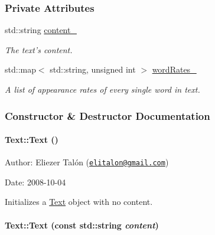\subsubsection*{Private Attributes}
\begin{CompactItemize}
\item 
\hypertarget{class_text_8c5acddb86730d41099c87da7e386f6c}{
std::string \hyperlink{class_text_8c5acddb86730d41099c87da7e386f6c}{content\_\-}}
\label{class_text_8c5acddb86730d41099c87da7e386f6c}

\begin{CompactList}\small\item\em The text's content. \item\end{CompactList}\item 
\hypertarget{class_text_5f7e6b9d9ba0dbd7c1b4070ab42f1de1}{
std::map$<$ std::string, unsigned int $>$ \hyperlink{class_text_5f7e6b9d9ba0dbd7c1b4070ab42f1de1}{wordRates\_\-}}
\label{class_text_5f7e6b9d9ba0dbd7c1b4070ab42f1de1}

\begin{CompactList}\small\item\em A list of appearance rates of every single word in text. \item\end{CompactList}\end{CompactItemize}


\subsubsection{Constructor \& Destructor Documentation}
\hypertarget{class_text_b3e26143fccc52699bcc5149cae852bc}{
\paragraph[Text]{\setlength{\rightskip}{0pt plus 5cm}Text::Text ()}\hfill}
\label{class_text_b3e26143fccc52699bcc5149cae852bc}


\begin{Desc}
\item[Author:]Eliezer Talón (\href{mailto:elitalon@gmail.com}{\tt elitalon@gmail.com}) \end{Desc}
\begin{Desc}
\item[Date:]2008-10-04\end{Desc}
Initializes a \hyperlink{class_text}{Text} object with no content. \hypertarget{class_text_c3c20ee8baeb7b88e2622724f57e50a2}{
\paragraph[Text]{\setlength{\rightskip}{0pt plus 5cm}Text::Text (const std::string {\em content})}\hfill}
\label{class_text_c3c20ee8baeb7b88e2622724f57e50a2}


